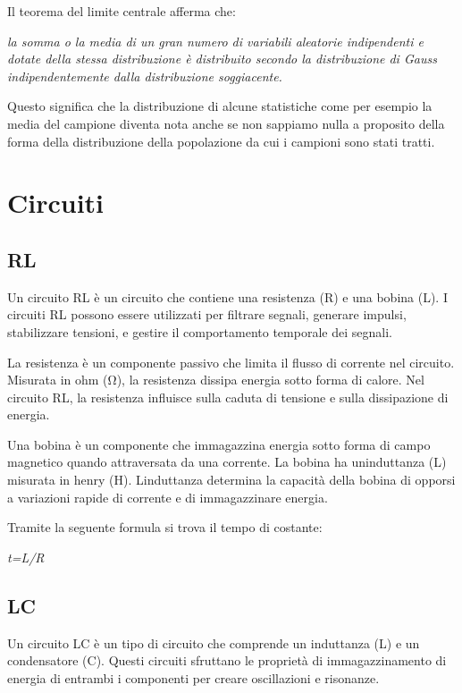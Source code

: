 Il teorema del limite centrale afferma che:

\emph{la somma o la media di un gran numero di variabili aleatorie
indipendenti e dotate della stessa distribuzione è distribuito secondo
la distribuzione di Gauss indipendentemente dalla distribuzione
soggiacente.}

Questo significa che la distribuzione di alcune statistiche come per
esempio la media del campione diventa nota anche se non sappiamo nulla a
proposito della forma della distribuzione della popolazione da cui i
campioni sono stati tratti.

\section{Circuiti}\label{circuiti}

\subsection{RL}\label{rl}

Un circuito RL è un circuito che contiene una resistenza (R) e una
bobina (L). I circuiti RL possono essere utilizzati per filtrare
segnali, generare impulsi, stabilizzare tensioni, e gestire il
comportamento temporale dei segnali.

La resistenza è un componente passivo che limita il flusso di corrente
nel circuito. Misurata in ohm (Ω), la resistenza dissipa energia sotto
forma di calore. Nel circuito RL, la resistenza influisce sulla caduta
di tensione e sulla dissipazione di energia.

Una bobina è un componente che immagazzina energia sotto forma di campo
magnetico quando attraversata da una corrente. La bobina ha
un\textquotesingle induttanza (L) misurata in henry (H).
L\textquotesingle induttanza determina la capacità della bobina di
opporsi a variazioni rapide di corrente e di immagazzinare energia.

Tramite la seguente formula si trova il tempo di costante:

\emph{t=L/R}

\subsection{LC}\label{lc}

Un circuito LC è un tipo di circuito che comprende un induttanza (L) e
un condensatore (C). Questi circuiti sfruttano le proprietà di
immagazzinamento di energia di entrambi i componenti per creare
oscillazioni e risonanze.

